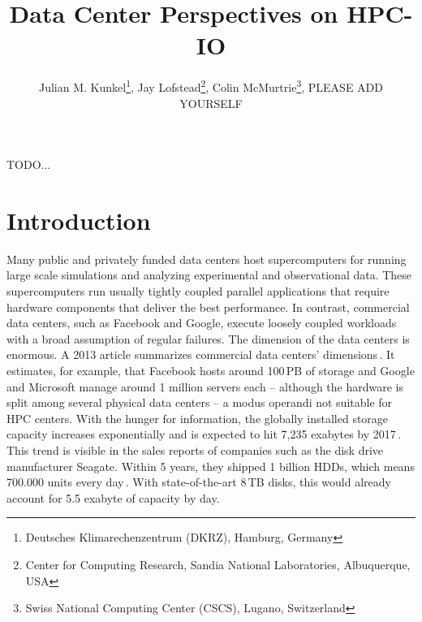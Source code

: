 \documentclass{superfri}
\numberwithin{equation}{section}
\begin{document}
TODO...

\author{Julian M. Kunkel\footnote{\label{dkrz}Deutsches Klimarechenzentrum (DKRZ), Hamburg, Germany}, 
Jay Lofstead\footnote{Center for Computing Research, Sandia National Laboratories, Albuquerque, USA}, 
Colin McMurtrie\footnote{Swiss National Computing Center (CSCS), Lugano, Switzerland}, 
PLEASE ADD YOURSELF
} %

\title{Data Center Perspectives on HPC-IO}
\maketitle{}

\begin{abstract}

\noindent
{}
\end{abstract}

\section{Introduction}
\label{sec:intro}

Many public and privately funded data centers host supercomputers for running large scale simulations and analyzing experimental and observational data.
These supercomputers run usually tightly coupled parallel applications that require hardware components that deliver the best performance.
In contrast, commercial data centers, such as Facebook and Google, execute loosely coupled workloads with a broad assumption of regular failures.
The dimension of the data centers is enormous.
A 2013 article summarizes commercial data centers' dimensions\,\cite{data13}. It estimates, for example, that 
Facebook hosts around 100\,PB of storage and Google and Microsoft manage around 1 million servers each -- although the hardware is split among several physical data centers -- a modus operandi not suitable for HPC centers.
With the hunger for information, the globally installed storage capacity increases exponentially and is expected to hit 7,235 exabytes by 2017\,\cite{EXA13}.
This trend is visible in the sales reports of companies such as the disk drive manufacturer Seagate. Within 5 years, they shipped 1 billion HDDs, which means 700.000 units every day\,\cite{SG14}.  
With state-of-the-art 8\,TB disks, this would already account for 5.5 exabyte of capacity by day.
\end{document}
